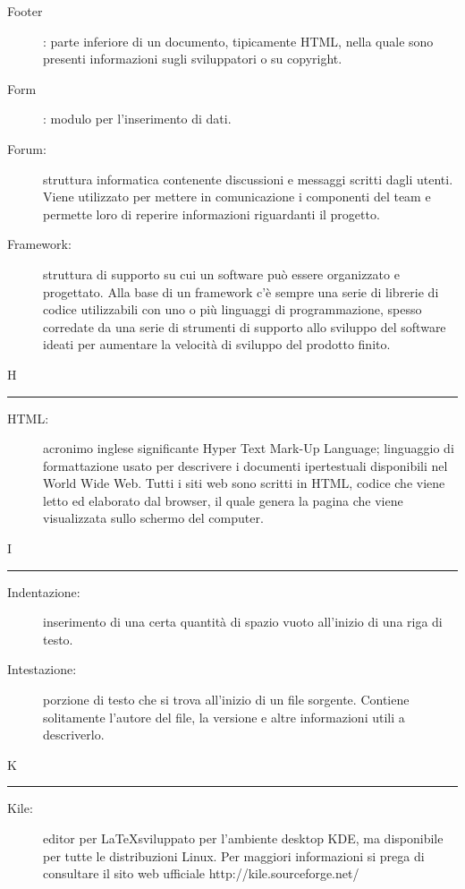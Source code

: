 \documentclass[11pt,a4paper]{article}
\begin{document}
\begin{description}
	\item[Footer]: parte inferiore di un documento, tipicamente HTML, nella quale sono presenti informazioni sugli sviluppatori o su copyright.
	\item[Form]: modulo per l'inserimento di dati.
	\item[Forum:] struttura informatica contenente discussioni e messaggi scritti dagli utenti. Viene utilizzato per mettere in comunicazione i componenti del team e permette loro di reperire informazioni riguardanti il progetto.
	\item[Framework:] struttura di supporto su cui un software può essere organizzato e progettato. Alla base di un framework c'è sempre una serie di librerie di codice utilizzabili con uno o più linguaggi di programmazione, spesso corredate da una serie di strumenti di supporto allo sviluppo del software ideati per aumentare la velocità di sviluppo del prodotto finito.
\end{description}
\bigskip
\Huge H \bigskip
\hrule
\smallskip
\normalsize
\begin{description}
	\item[HTML:] acronimo inglese significante Hyper Text Mark-Up Language; linguaggio di formattazione usato per descrivere i documenti ipertestuali disponibili nel World Wide Web. Tutti i siti web sono scritti in HTML, codice che viene letto ed elaborato dal browser, il quale genera la pagina che viene visualizzata sullo schermo del computer.
\end{description}
\bigskip
\Huge I \bigskip
\hrule
\smallskip
\normalsize
\begin{description}
	\item[Indentazione:] inserimento di una certa quantità di spazio vuoto all'inizio di una riga di testo.
	\item[Intestazione:] porzione di testo che si trova all'inizio di un file sorgente. Contiene solitamente l'autore del file, la versione e altre informazioni utili a descriverlo.
\end{description}
\bigskip
\Huge K \bigskip
\hrule
\smallskip
\normalsize
\begin{description}
	\item[Kile:] editor per \LaTeX \space sviluppato per l'ambiente desktop KDE, ma disponibile per tutte le distribuzioni Linux. Per maggiori informazioni si prega di consultare il sito web ufficiale http://kile.sourceforge.net/
\end{description}
\end{document}
